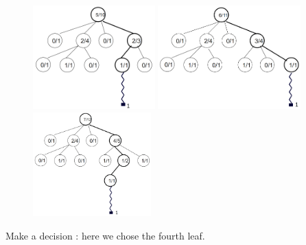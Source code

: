\begin{figure}[H]
\centering
	\begin{minipage}[b]{0.33\linewidth}
	\centering
		\includegraphics[height=4cm]{1_Presentation/1.2_Algorithm_MCTS_Benoit/img/10.png}
	\end{minipage}%
	\begin{minipage}[b]{0.33\linewidth}
	\centering
		\includegraphics[height=4cm]{1_Presentation/1.2_Algorithm_MCTS_Benoit/img/11.png}
	\end{minipage}%
	\begin{minipage}[b]{0.33\linewidth}
	\centering
		\includegraphics[height=4cm]{1_Presentation/1.2_Algorithm_MCTS_Benoit/img/12.png}
	\end{minipage}%
\end{figure}

Make a decision : here we chose the fourth leaf.\\
\newpage
